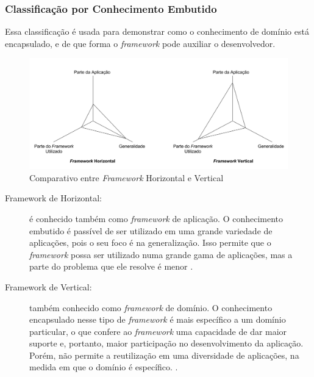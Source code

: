 \subsubsection{Classificação por Conhecimento Embutido}
Essa classificação é usada para demonstrar como o conhecimento de domínio está encapsulado, e de que forma o \textit{framework} pode auxiliar o desenvolvedor.
\begin{figure}[h]
    \centering
    \includegraphics[width=\textwidth]{figuras/frameworkhorizontalvertical.png}
    \caption{Comparativo entre \textit{Framework} Horizontal e Vertical}
    \label{fig:frameworkhorizontalvertical}
  \end{figure}
\par
\begin{description}
\item[Framework de Horizontal:] é conhecido também como \textit{framework} de aplicação. O conhecimento embutido é passível de ser utilizado em uma grande variedade de aplicações, pois o seu foco é na generalização. Isso permite que o \textit{framework} possa ser utilizado numa grande gama de aplicações, mas a parte do problema que ele resolve é menor \cite{barretoJunior2006}.
\item[Framework de Vertical:] também conhecido como \textit{framework} de domínio. O conhecimento encapsulado nesse tipo de \textit{framework} é mais específico a um domínio particular, o que confere ao \textit{framework} uma capacidade de dar maior suporte e, portanto, maior participação no desenvolvimento da aplicação. Porém, não permite a reutilização em uma diversidade de aplicações, na medida em que o domínio é específico. \cite{barretoJunior2006}.
\end{description}

